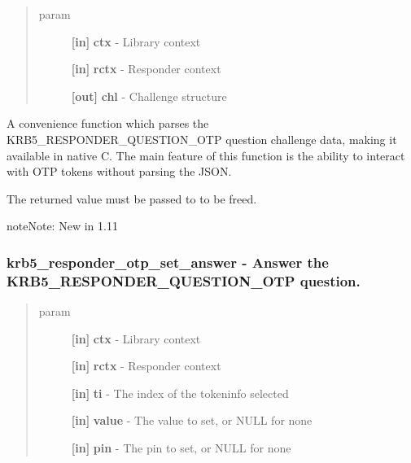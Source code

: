 \documentclass[letterpaper,10pt,english]{sphinxmanual}
\begin{document}
\begin{quote}\begin{description}
\item[{param}] \leavevmode
\textbf{{[}in{]}} \textbf{ctx} - Library context

\textbf{{[}in{]}} \textbf{rctx} - Responder context

\textbf{{[}out{]}} \textbf{chl} - Challenge structure

\end{description}\end{quote}

A convenience function which parses the KRB5\_RESPONDER\_QUESTION\_OTP question challenge data, making it available in native C. The main feature of this function is the ability to interact with OTP tokens without parsing the JSON.

The returned value must be passed to {\hyperref[appdev/refs/api/krb5_responder_otp_challenge_free:c.krb5_responder_otp_challenge_free]{}} to be freed.

\begin{notice}{note}{Note:}
New in 1.11
\end{notice}


\subsubsection{krb5\_responder\_otp\_set\_answer -  Answer the KRB5\_RESPONDER\_QUESTION\_OTP question.}
\label{appdev/refs/api/krb5_responder_otp_set_answer:krb5-responder-otp-set-answer-answer-the-krb5-responder-question-otp-question}\label{appdev/refs/api/krb5_responder_otp_set_answer::doc}

\begin{fulllineitems}
\label{appdev/refs/api/krb5_responder_otp_set_answer:c.krb5_responder_otp_set_answer}
\end{fulllineitems}

\begin{quote}\begin{description}
\item[{param}] \leavevmode
\textbf{{[}in{]}} \textbf{ctx} - Library context

\textbf{{[}in{]}} \textbf{rctx} - Responder context

\textbf{{[}in{]}} \textbf{ti} - The index of the tokeninfo selected

\textbf{{[}in{]}} \textbf{value} - The value to set, or NULL for none

\textbf{{[}in{]}} \textbf{pin} - The pin to set, or NULL for none

\end{description}\end{quote}
\end{document}
